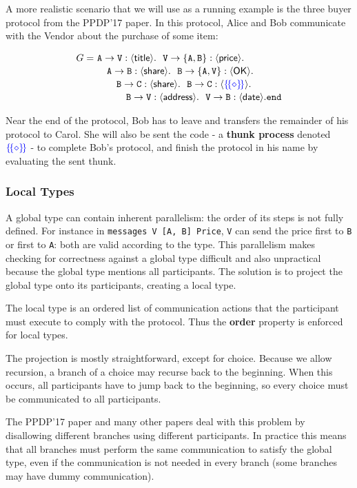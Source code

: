\documentclass[runningheads,plain]{llncs}
\begin{document}
A more realistic scenario that we will use as a running example is the
three buyer protocol from the PPDP'17 paper. In this protocol, Alice and
Bob communicate with the Vendor about the purchase of some item:

\begin{align*}
G = ~&  \mathtt{A}\to\mathtt{\texttt{V}}:\langle \mathsf{title}\rangle.~~\mathtt{\mathtt{V}}\to\mathtt{\{A,B\}}:\langle \mathsf{price}\rangle.\\[-0.5mm] 
& \quad\mathtt{A}\to\mathtt{B}:\langle \mathsf{share}\rangle.~~\mathtt{B}\to\mathtt{\{A,\mathtt{V}\}}:\langle \mathsf{OK}\rangle.
\\[-0.5mm]
& \quad\quad \mathtt{B}\to\mathtt{C}:\langle \mathsf{share}\rangle.~~\mathtt{B}\to\mathtt{C}:\langle \textcolor{blue}{\{\!\{\diamond\}\!\}}\rangle.
\\[-0.5mm]
& \quad\qquad \mathtt{B}\to\mathtt{\mathtt{V}}:\langle \mathsf{address}\rangle.~~\mathtt{\mathtt{V}}\to\mathtt{B}:\langle \mathsf{date}\rangle.\mathtt{end}
\end{align*}

Near the end of the protocol, Bob has to leave and transfers the
remainder of his protocol to Carol. She will also be sent the code - a
\textbf{thunk process} denoted \(\textcolor{blue}{\{\!\{\diamond\}\!\}}\) - to
complete Bob's protocol, and finish the protocol in his name by
evaluating the sent thunk.


\subsubsection{Local Types}\label{local-types}

A global type can contain inherent parallelism: the order of its steps
is not fully defined. For instance in
\texttt{messages\ V\ {[}A,\ B{]}\ Price}, \texttt{V} can send the price
first to \texttt{B} or first to \texttt{A}: both are valid according to
the type. This parallelism makes checking for correctness against a
global type difficult and also unpractical because the global type
mentions all participants. The solution is to project the global type
onto its participants, creating a local type.

The local type is an ordered list of communication actions that the
participant must execute to comply with the protocol. Thus the
\textbf{order} property is enforced for local types.

The projection is mostly straightforward, except for choice. Because we
allow recursion, a branch of a choice may recurse back to the beginning.
When this occurs, all participants have to jump back to the beginning,
so every choice must be communicated to all participants.

The PPDP'17 paper and many other papers deal with this problem by
disallowing different branches using different participants. In practice
this means that all branches must perform the same communication to
satisfy the global type, even if the communication is not needed in
every branch (some branches may have dummy communication).
\end{document}
